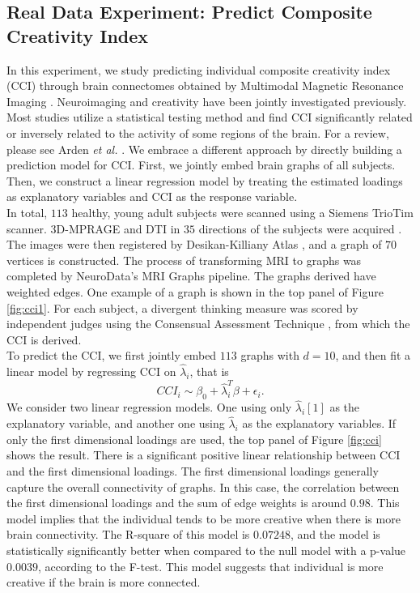 \documentclass[10pt,journal,compsoc]{IEEEtran}
\begin{document}
\subsection{Real Data Experiment: Predict Composite Creativity Index}
In this experiment, we study predicting individual composite creativity index (CCI) through brain connectomes obtained by Multimodal Magnetic Resonance Imaging \cite{koutra2013d}. Neuroimaging and creativity have been jointly investigated previously. Most studies utilize a statistical testing method and find CCI significantly related or inversely related to the activity of some regions of the brain. For a review, please see Arden \textit{et al.} \cite{arden2010neuroimaging}. We embrace a different approach by directly building a prediction model for CCI. First, we jointly embed brain graphs of all subjects. Then, we construct a linear regression model by treating the estimated loadings as explanatory variables and CCI as the response variable. \\

\noindent In total, $113$ healthy, young adult subjects were scanned using a Siemens TrioTim scanner. 3D-MPRAGE and DTI in $35$ directions of the subjects were acquired \cite{brant1992mp}. The images were then registered by Desikan-Killiany Atlas \cite{desikan2006automated}, and a graph of $70$ vertices is constructed. The process of transforming MRI to graphs was completed by NeuroData's MRI Graphs pipeline\cite{kiar2016ndmgcode}. The graphs derived have weighted edges. One example of a graph is shown in the top panel of Figure \ref{fig:cci1}. For each subject, a divergent thinking measure was scored by independent judges using the Consensual Assessment Technique \cite{amabile1983social}, from which the CCI is derived. \\

\noindent To predict the CCI, we first jointly embed $113$ graphs with $d=10$, and then fit a linear model by regressing CCI on $\hat{\lambda}_i$, that is
\[CCI_i \sim \beta_0+\hat{\lambda}_i^T\beta + \epsilon_i. \]
We consider two linear regression models. One using only $\hat{\lambda}_i[1]$ as the explanatory variable, and another one using $\hat{\lambda}_i$ as the explanatory variables. If only the first dimensional loadings are used, the top panel of Figure \ref{fig:cci} shows the result. There is a significant positive linear relationship between CCI and the first dimensional loadings. The first dimensional loadings generally capture the overall connectivity of graphs. In this case, the correlation between the first dimensional loadings and the sum of edge weights is around $0.98$. This model implies that the individual tends to be more creative when there is more brain connectivity. The R-square of this model is $0.07248$, and the model is statistically significantly better when compared to the null model with a p-value $0.0039$, according to the F-test. This model suggests that individual is more creative if the brain is more connected.\\
\end{document}
